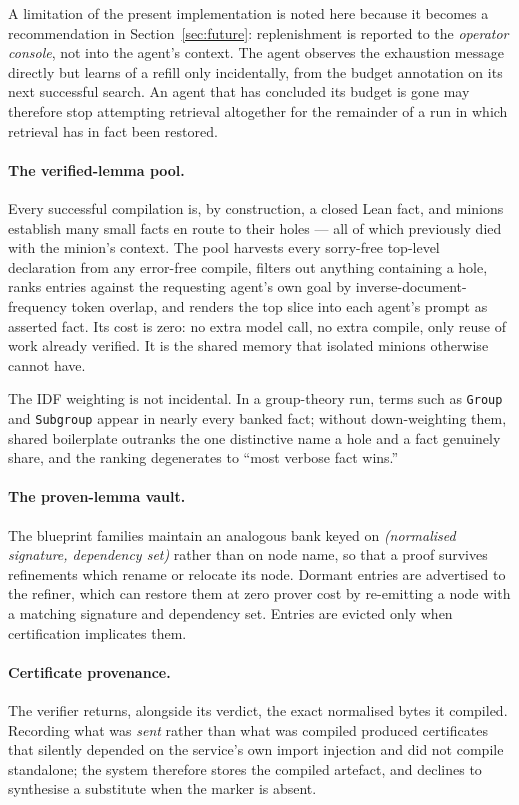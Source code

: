 \documentclass[12pt, a4paper]{article}
\begin{document}
A limitation of the present implementation is noted here because it becomes
a recommendation in Section~\ref{sec:future}: replenishment is reported to
the \emph{operator console}, not into the agent's context. The agent
observes the exhaustion message directly but learns of a refill only
incidentally, from the budget annotation on its next successful search. An
agent that has concluded its budget is gone may therefore stop attempting
retrieval altogether for the remainder of a run in which retrieval has in
fact been restored.

\paragraph{The verified-lemma pool.} Every successful compilation is, by
construction, a closed Lean fact, and minions establish many small facts en
route to their holes --- all of which previously died with the minion's
context. The pool harvests every sorry-free top-level declaration from any
error-free compile, filters out anything containing a hole, ranks entries
against the requesting agent's own goal by inverse-document-frequency token
overlap, and renders the top slice into each agent's prompt as asserted
fact. Its cost is zero: no extra model call, no extra compile, only reuse of
work already verified. It is the shared memory that isolated minions
otherwise cannot have.

The IDF weighting is not incidental. In a group-theory run, terms such as
\texttt{Group} and \texttt{Subgroup} appear in nearly every banked fact;
without down-weighting them, shared boilerplate outranks the one
distinctive name a hole and a fact genuinely share, and the ranking
degenerates to ``most verbose fact wins.''

\paragraph{The proven-lemma vault.} The blueprint families maintain an
analogous bank keyed on \emph{(normalised signature, dependency set)} rather
than on node name, so that a proof survives refinements which rename or
relocate its node. Dormant entries are advertised to the refiner, which can
restore them at zero prover cost by re-emitting a node with a matching
signature and dependency set. Entries are evicted only when certification
implicates them.

\paragraph{Certificate provenance.} The verifier returns, alongside its
verdict, the exact normalised bytes it compiled. Recording what was
\emph{sent} rather than what was compiled produced certificates that
silently depended on the service's own import injection and did not compile
standalone; the system therefore stores the compiled artefact, and declines
to synthesise a substitute when the marker is absent.
\end{document}
